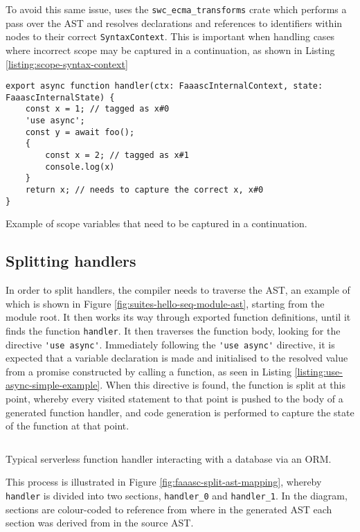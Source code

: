 To avoid this same issue, \faaasc{} uses the \verb|swc_ecma_transforms| crate which performs a pass over the AST and resolves declarations and references to identifiers within nodes to their correct \verb|SyntaxContext|. This is important when handling cases where incorrect scope may be captured in a continuation, as shown in Listing \ref{listing:scope-syntax-context}

\begin{listing}[H]
\begin{verbatim}
export async function handler(ctx: FaaascInternalContext, state: FaaascInternalState) {
    const x = 1; // tagged as x#0
    'use async';
    const y = await foo();
    {
        const x = 2; // tagged as x#1
        console.log(x)
    }
    return x; // needs to capture the correct x, x#0
}
\end{verbatim}
\caption{Example of scope variables that need to be captured in a continuation.}
\label{listing:scope-syntax-context}
\end{listing}

\subsection{Splitting \faas{} handlers}
In order to split handlers, the \faaasc{} compiler needs to traverse the AST, an example of which is shown in Figure \ref{fig:suites-hello-seq-module-ast}, starting from the module root. It then works its way through exported function definitions, until it finds the function \verb|handler|. It then traverses the function body, looking for the directive \verb|'use async'|. Immediately following the \verb|'use async'| directive, it is expected that a variable declaration is made and initialised to the resolved value from a promise constructed by calling a function, as seen in Listing \ref{listing:use-async-simple-example}. When this directive is found, the function is split at this point, whereby every visited statement to that point is pushed to the body of a generated function handler, and code generation is performed to capture the state of the function at that point.

\begin{listing}
  \inputminted{javascript}{node_modules/@faaas-bench/hello-seq/src/onHttpGetHello.trigger.ts}
  \caption{Typical serverless function handler interacting with a database via an ORM.}
\end{listing}

This process is illustrated in Figure \ref{fig:faaasc-split-ast-mapping}, whereby \verb|handler| is divided into two sections, \verb|handler_0| and \verb|handler_1|. In the diagram, sections are colour-coded to reference from where in the generated AST each section was derived from in the source AST.

